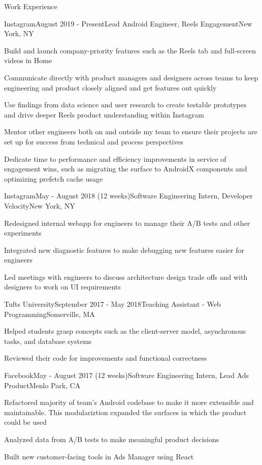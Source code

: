 \documentclass{resume}
\begin{document}
  \begin{rSection}{Work Experience}

    \begin{rSubsection}{Instagram}{August 2019 - Present}{Lead Android Engineer, Reels Engagement}{New York, NY}
      \item Build and launch company-priority features such as the Reels tab and full-screen videos in Home
      \item Communicate directly with product managers and designers across teams to keep engineering and product closely aligned and get features out quickly
      \item Use findings from data science and user research to create testable prototypes and drive deeper Reels product understanding within Instagram
      \item Mentor other engineers both on and outside my team to ensure their projects are set up for success from technical and process perspectives
      \item Dedicate time to performance and efficiency improvements in service of engagement wins, such as migrating the surface to AndroidX components and optimizing prefetch cache usage
    \end{rSubsection}

    \begin{rSubsection}{Instagram}{May - August 2018 (12 weeks)}{Software Engineering Intern, Developer Velocity}{New York, NY}
      \item Redesigned internal webapp for engineers to manage their A/B tests and other experiments
      \item Integrated new diagnostic features to make debugging new features easier for engineers
      \item Led meetings with engineers to discuss architecture design trade offs and with designers to work on UI requirements
    \end{rSubsection}

    \begin{rSubsection}{Tufts University}{September 2017 - May 2018}{Teaching Assistant - Web Programming}{Somerville, MA}
      \item Helped students grasp concepts such as the client-server model, asynchronous tasks, and database systems
      \item Reviewed their code for improvements and functional correctness
    \end{rSubsection}

  	\begin{rSubsection}{Facebook}{May - August 2017 (12 weeks)}{Software Engineering Intern, Lead Ads Product}{Menlo Park, CA}
      \item Refactored majority of team's Android codebase to make it more extensible and maintainable. This modulariztion expanded the surfaces in which the product could be used
      \item Analyzed data from A/B tests to make meaningful product decisions
      \item Built new customer-facing tools in Ads Manager using React
    \end{rSubsection}


\end{rSection}
\end{document}
